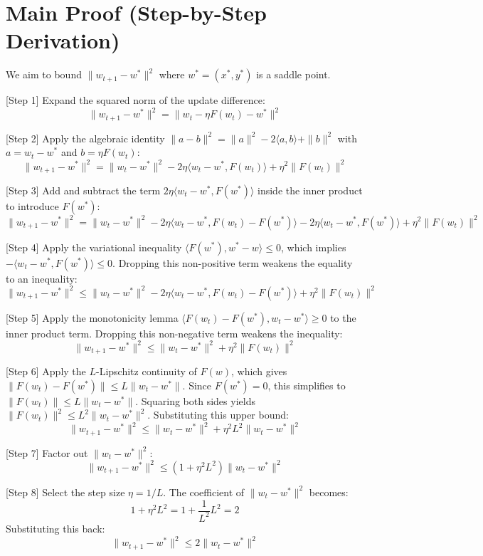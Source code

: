 \documentclass{article}
\begin{document}
\section*{Main Proof (Step-by-Step Derivation)}
We aim to bound $\|w_{t+1} - w^*\|^2$ where $w^* = (x^*, y^*)$ is a saddle point.

[Step 1] Expand the squared norm of the update difference:
$$ \|w_{t+1} - w^*\|^2 = \|w_t - \eta F(w_t) - w^*\|^2 $$

[Step 2] Apply the algebraic identity $\|a - b\|^2 = \|a\|^2 - 2\langle a, b \rangle + \|b\|^2$ with $a = w_t - w^*$ and $b = \eta F(w_t)$:
$$ \|w_{t+1} - w^*\|^2 = \|w_t - w^*\|^2 - 2\eta \langle w_t - w^*, F(w_t) \rangle + \eta^2 \|F(w_t)\|^2 $$

[Step 3] Add and subtract the term $2\eta \langle w_t - w^*, F(w^*) \rangle$ inside the inner product to introduce $F(w^*)$:
$$ \|w_{t+1} - w^*\|^2 = \|w_t - w^*\|^2 - 2\eta \langle w_t - w^*, F(w_t) - F(w^*) \rangle - 2\eta \langle w_t - w^*, F(w^*) \rangle + \eta^2 \|F(w_t)\|^2 $$

[Step 4] Apply the variational inequality $\langle F(w^*), w^* - w \rangle \leq 0$, which implies $-\langle w_t - w^*, F(w^*) \rangle \leq 0$. Dropping this non-positive term weakens the equality to an inequality:
$$ \|w_{t+1} - w^*\|^2 \leq \|w_t - w^*\|^2 - 2\eta \langle w_t - w^*, F(w_t) - F(w^*) \rangle + \eta^2 \|F(w_t)\|^2 $$

[Step 5] Apply the monotonicity lemma $\langle F(w_t) - F(w^*), w_t - w^* \rangle \geq 0$ to the inner product term. Dropping this non-negative term weakens the inequality:
$$ \|w_{t+1} - w^*\|^2 \leq \|w_t - w^*\|^2 + \eta^2 \|F(w_t)\|^2 $$

[Step 6] Apply the $L$-Lipschitz continuity of $F(w)$, which gives $\|F(w_t) - F(w^*)\| \leq L \|w_t - w^*\|$. Since $F(w^*) = 0$, this simplifies to $\|F(w_t)\| \leq L \|w_t - w^*\|$. Squaring both sides yields $\|F(w_t)\|^2 \leq L^2 \|w_t - w^*\|^2$. Substituting this upper bound:
$$ \|w_{t+1} - w^*\|^2 \leq \|w_t - w^*\|^2 + \eta^2 L^2 \|w_t - w^*\|^2 $$

[Step 7] Factor out $\|w_t - w^*\|^2$:
$$ \|w_{t+1} - w^*\|^2 \leq (1 + \eta^2 L^2) \|w_t - w^*\|^2 $$

[Step 8] Select the step size $\eta = 1/L$. The coefficient of $\|w_t - w^*\|^2$ becomes:
$$ 1 + \eta^2 L^2 = 1 + \frac{1}{L^2} L^2 = 2 $$
Substituting this back:
$$ \|w_{t+1} - w^*\|^2 \leq 2 \|w_t - w^*\|^2 $$
\end{document}
